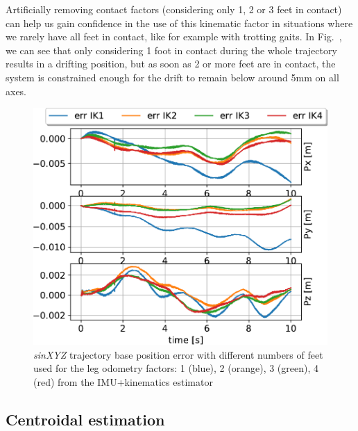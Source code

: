 Artificially removing contact factors (considering only 1, 2 or 3 feet in contact) can help us gain confidence in the use of this kinematic factor 
in situations where we rarely have all feet in contact, like for example with trotting gaits. In Fig.~, we can see that only considering 
1 foot in contact during the whole trajectory results in a drifting position, but as soon as 2 or more feet are in contact, the system is constrained enough 
for the drift to remain below around 5mm on all axes. 
%
\begin{figure}[t]
    \centering
    \includegraphics[height=0.6\columnwidth]{figures/centroidal/base_position_err_IKn.pdf}
    \caption{\textit{sinXYZ} trajectory base position error with different numbers of feet used for the leg odometry factors: 
    1 (blue), 2 (orange), 3 (green), 4 (red) from the IMU+kinematics estimator}
    \label{fig:ErrIKn}
\end{figure}
%

\subsection{Centroidal estimation}

